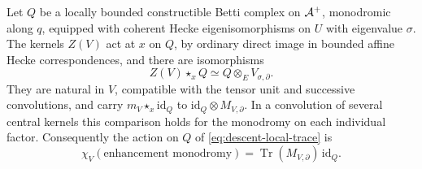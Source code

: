 \begin{lemma}
\label{lem:central-globalization}
Let $Q$ be a locally bounded constructible Betti complex on $\mathcal A^+$,
monodromic along $q$, equipped with coherent Hecke eigenisomorphisms
on $U$ with eigenvalue $\sigma$.  The kernels $Z(V)$ act at $x$ on
$Q$, by ordinary direct image in bounded affine Hecke
correspondences, and there are isomorphisms
\begin{equation}\label{eq:descent-central-eigen}
 Z(V)\star_x Q\simeq Q\otimes_E V_{\sigma,\partial}.
\end{equation}
They are natural in $V$, compatible with the tensor unit and
successive convolutions, and carry $m_V\star_x\mathrm{id}_Q$ to
$\mathrm{id}_Q\otimes M_{V,\partial}$.  In a convolution of several
central kernels this comparison holds for the monodromy on each
individual factor.  Consequently the action on $Q$ of
\eqref{eq:descent-local-trace} is
\begin{equation}\label{eq:descent-global-trace}
 \chi_V(\text{enhancement monodromy})
 =\operatorname{Tr}(M_{V,\partial})\,\mathrm{id}_Q.
\end{equation}
\end{lemma}

